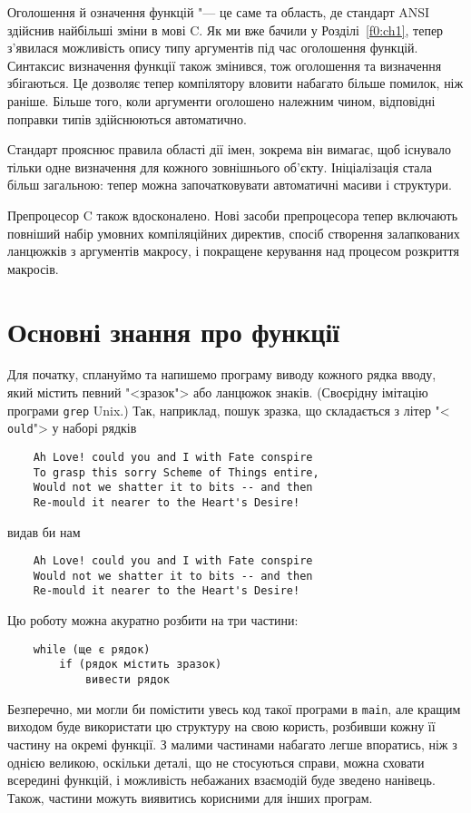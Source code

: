\documentclass[a4paper,12pt]{book}
\begin{document}
  Оголошення й означення функцій "--- це саме та область, де стандарт ANSI здійснив
  найбільші зміни в мові C. Як ми вже бачили у Розділі~\ref{f0:ch1}, тепер
  з'явилася можливість опису типу аргументів під час оголошення функцій. Синтаксис
  визначення функції також змінився, тож оголошення та визначення збігаються. Це дозволяє
  тепер компілятору вловити набагато більше помилок, ніж раніше. Більше того, коли
  аргументи оголошено належним чином, відповідні поправки типів здійснюються автоматично.

  Стандарт прояснює правила області дії імен, зокрема він вимагає, щоб існувало тільки
  одне визначення для кожного зовнішнього об'єкту. Ініціалізація стала більш
  загальною: тепер можна започатковувати автоматичні масиви і структури.

  Препроцесор C також вдосконалено. Нові засоби препроцесора тепер включають повніший
  набір умовних компіляційних директив, спосіб створення залапкованих ланцюжків з
  аргументів макросу, і покращене керування над процесом розкриття макросів.

\section{Основні знання про функції}

\label{f0:ch4.1}
  Для початку, сплануймо та напишемо програму виводу кожного рядка вводу, який містить
  певний "<зразок"> або ланцюжок знаків. (Своєрідну імітацію програми
  \texttt{grep} Unix.) Так, наприклад, пошук зразка, що складається з літер "<
  \texttt{ould}"> у наборі рядків
  \begin{verbatim}
    Ah Love! could you and I with Fate conspire
    To grasp this sorry Scheme of Things entire,
    Would not we shatter it to bits -- and then
    Re-mould it nearer to the Heart's Desire!
  \end{verbatim}
  видав би нам
  \begin{verbatim}
    Ah Love! could you and I with Fate conspire
    Would not we shatter it to bits -- and then
    Re-mould it nearer to the Heart's Desire!
  \end{verbatim}

  Цю роботу можна акуратно розбити на три частини:
  \begin{verbatim}
    while (ще є рядок)
        if (рядок містить зразок)
            вивести рядок
  \end{verbatim}

  Безперечно, ми могли би помістити увесь код такої програми в \texttt{main}, але кращим
  виходом буде використати цю структуру на свою користь, розбивши кожну її частину на
  окремі функції. З малими частинами набагато легше впоратись, ніж з однією великою,
  оскільки деталі, що не стосуються справи, можна сховати всередині функцій, і можливість
  небажаних взаємодій буде зведено нанівець. Також, частини можуть виявитись корисними для
  інших програм.
\end{document}
